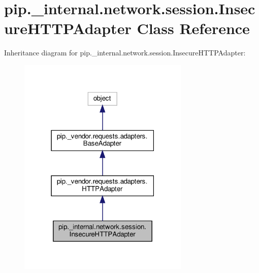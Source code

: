 \hypertarget{classpip_1_1__internal_1_1network_1_1session_1_1InsecureHTTPAdapter}{}\section{pip.\+\_\+internal.\+network.\+session.\+Insecure\+H\+T\+T\+P\+Adapter Class Reference}
\label{classpip_1_1__internal_1_1network_1_1session_1_1InsecureHTTPAdapter}


Inheritance diagram for pip.\+\_\+internal.\+network.\+session.\+Insecure\+H\+T\+T\+P\+Adapter\+:
\nopagebreak
\begin{figure}[H]
\begin{center}
\leavevmode
\includegraphics[width=231pt]{classpip_1_1__internal_1_1network_1_1session_1_1InsecureHTTPAdapter__inherit__graph}
\end{center}
\end{figure}


